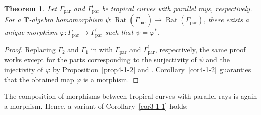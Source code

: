 \documentclass[a4paper,12pt]{amsart}
\newtheorem{thm}[dfn]{Theorem}
\def\Gamma{\varGamma}
\begin{document}
\begin{thm}
    \label{thm4-2-1}
Let $\Gamma_{\operatorname{par}}$ and $\Gamma^{\prime}_{\operatorname{par}}$ be tropical curves with parallel rays, respectively.
For a $\boldsymbol{T}$-algebra homomorphism $\psi : \operatorname{Rat}(\Gamma^{\prime}_{\operatorname{par}}) \to \operatorname{Rat}(\Gamma_{\operatorname{par}})$, there exists a unique morphism $\varphi : \Gamma_{\operatorname{par}} \to \Gamma^{\prime}_{\operatorname{par}}$ such that $\psi = \varphi^{\ast}$.
\end{thm}

\begin{proof}
Replacing $\Gamma_2$ and $\Gamma_1$ in \cite[Corollary~A1 and its proof]{JuAe4} with $\Gamma_{\operatorname{par}}$ and $\Gamma^{\prime}_{\operatorname{par}}$, respectively, the same proof works except for the parts corresponding to the surjectivity of $\psi$ and the injectivity of $\varphi$ by Proposition~\ref{prop4-1-2} and \cite[Theorem~3.14]{JuAe4}.
Corollary~\ref{cor4-1-2} guaranties that the obtained map $\varphi$ is a morphism.
\end{proof}

The composition of morphisms between tropical curves with parallel rays is again a morphism.
Hence, a variant of Corollary~\ref{cor3-1-1} holds:
\end{document}

